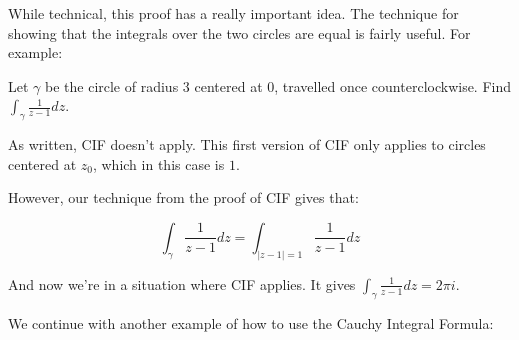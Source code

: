 While technical, this proof has a really important idea. The technique for showing that the integrals over the two circles are equal is fairly useful. For example:

\begin{ex}{}{}Let $\gamma$ be the circle of radius $3$ centered at $0$, travelled once counterclockwise. Find $\int_{\gamma} \frac{1}{z-1}dz$.

As written, CIF doesn't apply. This first version of CIF only applies to circles centered at $z_0$, which in this case is $1$.

However, our technique from the proof of CIF gives that:

$$\int_{\gamma} \frac{1}{z-1}dz = \int_{|z-1|=1} \frac{1}{z-1}dz$$

And now we're in a situation where CIF applies. It gives $\int_{\gamma} \frac{1}{z-1}dz = 2\pi i$.\end{ex}

We continue with another example of how to use the Cauchy Integral Formula:

